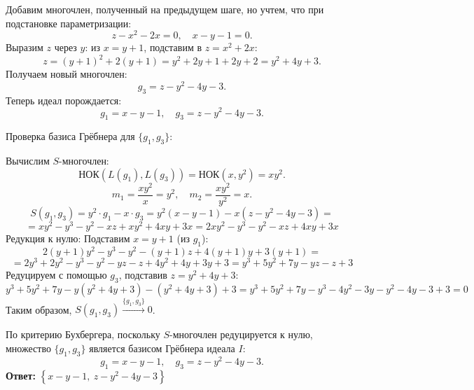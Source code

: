 \documentclass[a4paper]{article}
\begin{document}
\begin{enumerate}
     Добавим многочлен, полученный на предыдущем шаге, но учтем, что при подстановке параметризации:  
    \[
    z - x^2 - 2x = 0, \quad x - y - 1 = 0.
    \]
  Выразим \( z \) через \( y \): из \( x = y + 1 \), подставим в \( z = x^2 + 2x \):  
    \[
    z = (y+1)^2 + 2(y+1) = y^2 + 2y + 1 + 2y + 2 = y^2 + 4y + 3.
    \]
   Получаем новый многочлен:  
    \[
    g_3 = z - y^2 - 4y - 3.
    \]
  Теперь идеал порождается:  
    \[
    g_1 = x - y - 1, \quad g_3 = z - y^2 - 4y - 3.
    \]

  Проверка базиса Грёбнера для \( \{g_1, g_3\} \):

  Вычислим \( S \)-многочлен:
    \[
    \text{НОК}(L(g_1), L(g_3)) = \text{НОК}(x, y^2) = x y^2.
    \]
    \[
    m_1 = \frac{x y^2}{x} = y^2, \quad m_2 = \frac{x y^2}{y^2} = x.
    \]
    \[
    S(g_1, g_3) = y^2 \cdot g_1 - x \cdot g_3 = y^2(x - y - 1) - 
    x(z - y^2 - 4y - 3) =\]\[= x y^2 - y^3 - y^2 - x z + x y^2 + 4x y + 3x = 
    2x y^2 - y^3 - y^2 - x z + 4x y + 3x
    \]
  Редукция к нулю:
    Подставим \( x = y + 1 \) (из \( g_1 \)):  
      \[
      2(y+1)y^2 - y^3 - y^2 - (y+1)z + 4(y+1)y + 3(y+1) =\]\[= 2y^3 + 2y^2 - y^3 - y^2 - y z
       - z + 4y^2 + 4y + 3y + 3 = y^3 + 5y^2 + 7y - y z - z + 3
      \]
    Редуцируем с помощью \( g_3 \), подставив \( z = y^2 + 4y + 3 \):  
      \[
      y^3 + 5y^2 + 7y - y(y^2 + 4y + 3) - (y^2 + 4y + 3) + 3 = y^3 + 5y^2 + 7y 
      - y^3 - 4y^2 - 3y - y^2 - 4y - 3 + 3 = 0
      \]
    Таким образом, \( S(g_1, g_3) \xrightarrow{\{g_1, g_3\}} 0 \).

    По критерию Бухбергера, поскольку \( S \)-многочлен редуцируется к нулю, множество \( \{g_1, g_3\} \) является базисом Грёбнера идеала \( I \):
    \[
    g_1 = x - y - 1, \quad g_3 = z - y^2 - 4y - 3.
    \]
    \textbf{Ответ: } $\left\{ x - y - 1,\  z - y^{2} - 4y - 3 \right\}$


  \end{enumerate}
\end{document}
